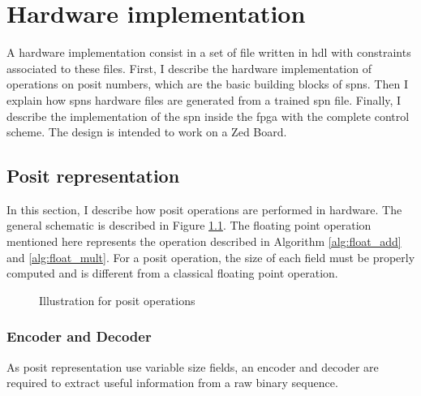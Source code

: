 
\chapter{Hardware implementation}
\label{cha:hard}

A hardware implementation consist in a set of file written in \gls{hdl} with constraints associated to these files. First, I describe the hardware implementation of operations on posit numbers, which are the basic building blocks of \glspl{spn}. Then I explain how \glspl{spn} hardware files are generated from a trained \gls{spn} file. Finally, I describe  the implementation of the \gls{spn} inside the \gls{fpga} with the complete control scheme. The design is intended to work on a Zed Board.

\section{Posit representation }

In this section, I describe how posit operations are performed in hardware. The general schematic is described in Figure \ref{fig:posit_op}. The floating point operation mentioned here represents the operation described in Algorithm \ref{alg:float_add} and \ref{alg:float_mult}. For a posit operation, the size of each field must be properly computed and is different from a classical floating point operation.

\begin{figure}[!ht]
\begin{mdframed}
	\centering
	
	\caption{Illustration for posit operations}
	\label{fig:posit_op}
\end{mdframed}
\end{figure}

\subsection{Encoder and Decoder}
As posit representation use variable size fields, an encoder and decoder are required to extract useful information from a raw binary sequence.

